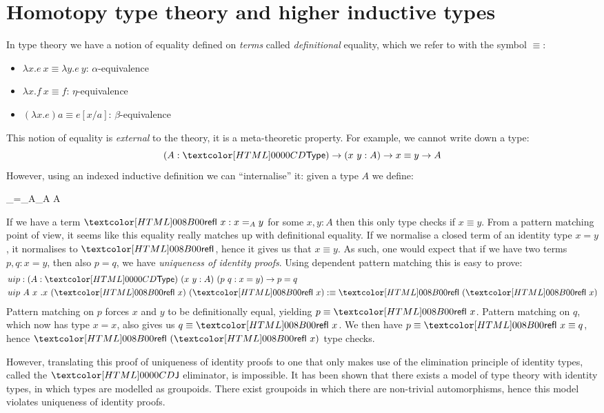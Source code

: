 \section{Homotopy type theory and higher inductive types}

In type theory we have a notion of equality defined on \emph{terms}
called \emph{definitional} equality, which we refer to with the symbol
$\equiv$:
\begin{itemize}
\item $\lambda x . e\ x \equiv \lambda y . e\ y$: $\alpha$-equivalence
\item $\lambda x . f\ x \equiv f$: $\eta$-equivalence
\item $(\lambda x . e) a \equiv e[x/a]$: $\beta$-equivalence
\end{itemize}

This notion of equality is \emph{external} to the theory, it is a
meta-theoretic property. For example, we cannot write down a type:
$$
(A : \Type) \to (x\ y : A) \to x \equiv y \to A
$$
However, using an indexed inductive definition we can ``internalise''
it: given a type $A$ we define:
%
\begin{datatype}{\_=_A\_}{A \to A \to \Type}
\end{datatype}
%
If we have a term $\refl\ x : x =_A y$ for some $x, y : A$ then this
only type checks if $x \equiv y$. From a pattern matching point of
view, it seems like this equality really matches up with definitional
equality. If we normalise a closed term of an identity type $x = y$,
it normalises to $\refl$, hence it gives us that $x \equiv y$. As
such, one would expect that if we have two terms $p, q : x = y$, then
also $p = q$, \ie we have \emph{uniqueness of identity proofs}. Using
dependent pattern matching this is easy to prove:
\begin{align*}
  &uip : (A : \Type)\ (x\ y : A)\ (p\ q : x = y) \to p = q \\
  &uip\ A\ x\ .x\ (\refl\ x)\ (\refl\ x) \ddefeq \refl\ (\refl\ x)
\end{align*}
Pattern matching on $p$ forces $x$ and $y$ to be definitionally equal,
yielding $p \equiv \refl\ x$. Pattern matching on $q$, which now has
type $x = x$, also gives us $q \equiv \refl\ x$. We then have
$p \equiv \refl\ x \equiv q$, hence $\refl\ (\refl\ x)$ type checks.

However, translating this proof of uniqueness of identity proofs to
one that only makes use of the elimination principle of identity
types, called the $\J$ eliminator, is impossible. It has been shown
that there exists a model of type theory with identity types, in which
types are modelled as groupoids. There exist groupoids in which there
are non-trivial automorphisms, hence this model violates uniqueness of
identity proofs.


